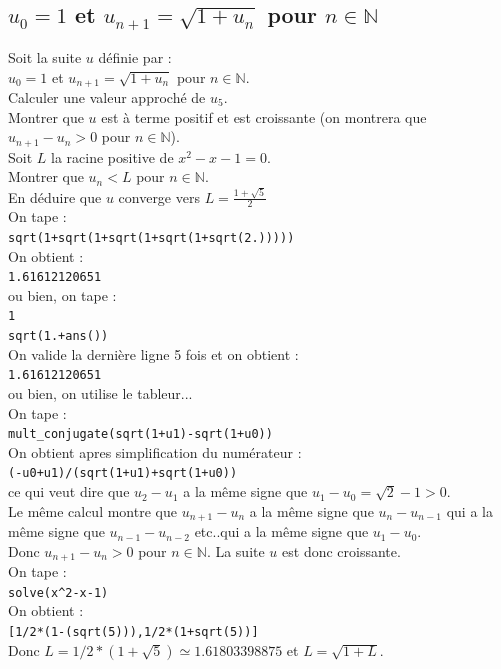 \documentclass[a4paper,11pt]{book}
\newcommand{\N}{{\mathbb{N}}}
\begin{document}
\subsection{$u_0=1$ et $u_{n+1}=\sqrt{1+u_n}$ pour $n\in \N$}
Soit la suite $u$ d\'efinie par :\\
$u_0=1$ et $u_{n+1}=\sqrt{1+u_n}$ pour $n\in \N$.\\
Calculer une valeur approch\'e de $u_5$.\\
Montrer que $u$ est \`a terme positif et est croissante (on montrera que
$u_{n+1}-u_n>0 $ pour $n\in \N$).\\
Soit $L$ la racine positive de $x^2-x-1=0$. \\
Montrer que $u_n<L$ pour $n\in \N$.\\
En d\'eduire que $u$ converge vers $\displaystyle L=\frac{1+\sqrt 5}{2}$\\
On tape :\\
{\tt sqrt(1+sqrt(1+sqrt(1+sqrt(1+sqrt(2.)))))}\\
On obtient :\\
{\tt 1.61612120651}\\
ou bien, on tape :\\
{\tt 1}\\
{\tt sqrt(1.+ans())}\\
On valide la derni\`ere ligne 5 fois et on obtient :\\
{\tt 1.61612120651}\\
ou bien, on utilise le tableur...\\
On tape :\\
{\tt mult\_conjugate(sqrt(1+u1)-sqrt(1+u0))}\\
On obtient apres simplification du num\'erateur :\\
{\tt (-u0+u1)/(sqrt(1+u1)+sqrt(1+u0))}\\
ce qui veut dire que $u_2-u_1$ a la m\^eme signe que $u_1-u_0=\sqrt 2-1>0$.\\
Le m\^eme calcul montre que $u_{n+1}-u_n$ a la m\^eme signe que $u_n-u_{n-1}$ qui
a la m\^eme signe que $u_{n-1}-u_{n-2}$ etc..qui a la m\^eme signe que 
$u_1-u_0$.\\
Donc $u_{n+1}-u_n>0$ pour $n\in \N$. La suite $u$ est donc croissante.\\
On tape :\\
{\tt solve(x\verb|^|2-x-1)}\\
On obtient :\\
{\tt [1/2*(1-(sqrt(5))),1/2*(1+sqrt(5))]}\\
Donc $L=1/2*(1+\sqrt 5)\simeq 1.61803398875$ et $L=\sqrt{1+L}$.\\
\end{document}
